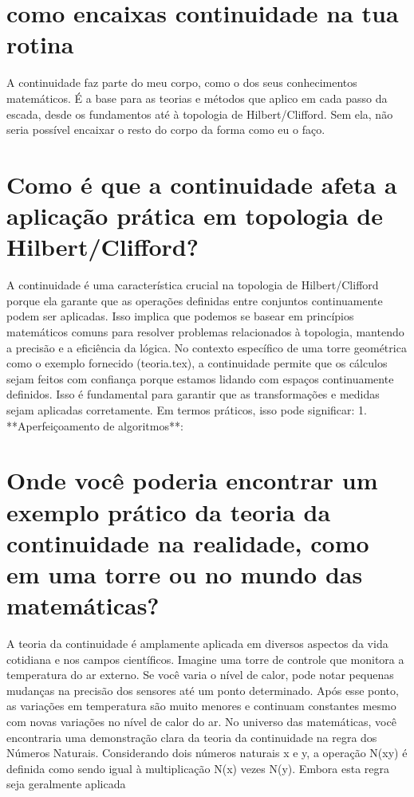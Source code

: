 \documentclass[11pt,a4paper]{article}
\begin{document}
\section{como encaixas continuidade na tua rotina}
A continuidade faz parte do meu corpo, como o dos seus conhecimentos matemáticos. É a base para as teorias e métodos que aplico em cada passo da escada, desde os fundamentos até à topologia de Hilbert/Clifford. Sem ela, não seria possível encaixar o resto do corpo da forma como eu o faço.

\section{Como é que a continuidade afeta a aplicação prática em topologia de Hilbert/Clifford?}
A continuidade é uma característica crucial na topologia de Hilbert/Clifford porque ela garante que as operações definidas entre conjuntos continuamente podem ser aplicadas. Isso implica que podemos se basear em princípios matemáticos comuns para resolver problemas relacionados à topologia, mantendo a precisão e a eficiência da lógica. No contexto específico de uma torre geométrica como o exemplo fornecido (teoria.tex), a continuidade permite que os cálculos sejam feitos com confiança porque estamos lidando com espaços continuamente definidos. Isso é fundamental para garantir que as transformações e medidas sejam aplicadas corretamente. Em termos práticos, isso pode significar: 1. **Aperfeiçoamento de algoritmos**:

\section{Onde você poderia encontrar um exemplo prático da teoria da continuidade na realidade, como em uma torre ou no mundo das matemáticas?}
A teoria da continuidade é amplamente aplicada em diversos aspectos da vida cotidiana e nos campos científicos. Imagine uma torre de controle que monitora a temperatura do ar externo. Se você varia o nível de calor, pode notar pequenas mudanças na precisão dos sensores até um ponto determinado. Após esse ponto, as variações em temperatura são muito menores e continuam constantes mesmo com novas variações no nível de calor do ar. No universo das matemáticas, você encontraria uma demonstração clara da teoria da continuidade na regra dos Números Naturais. Considerando dois números naturais x e y, a operação N(xy) é definida como sendo igual à multiplicação N(x) vezes N(y). Embora esta regra seja geralmente aplicada
\end{document}
